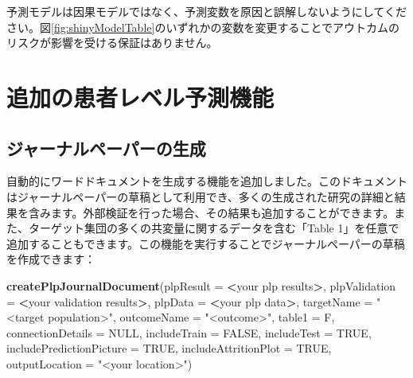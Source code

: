 \documentclass[
  11pt]{book}
\makeatletter
\newenvironment{Shaded}{\begin{snugshade}}{\end{snugshade}}
\newcommand{\AttributeTok}[1]{\textcolor[rgb]{0.13,0.29,0.53}{#1}}
\newcommand{\ConstantTok}[1]{\textcolor[rgb]{0.56,0.35,0.01}{#1}}
\newcommand{\FunctionTok}[1]{\textcolor[rgb]{0.13,0.29,0.53}{\textbf{#1}}}
\newcommand{\NormalTok}[1]{#1}
\newcommand{\SpecialCharTok}[1]{\textcolor[rgb]{0.81,0.36,0.00}{\textbf{#1}}}
\newcommand{\StringTok}[1]{\textcolor[rgb]{0.31,0.60,0.02}{#1}}
\newenvironment{kframe}{%
\medskip{}
\setlength{\fboxsep}{.8em}
 \def\at@end@of@kframe{}%
 \ifinner\ifhmode%
  \def\at@end@of@kframe{\end{minipage}}%
  \begin{minipage}{\columnwidth}%
 \fi\fi%
 \def\FrameCommand##1{\hskip\@totalleftmargin \hskip-\fboxsep
 \colorbox{myShadeColor}{##1}\hskip-\fboxsep
     \hskip-\linewidth \hskip-\@totalleftmargin \hskip\columnwidth}%
 \MakeFramed {\advance\hsize-\width
   \@totalleftmargin\z@ \linewidth\hsize
   \@setminipage}}%
 {\par\unskip\endMakeFramed%
 \at@end@of@kframe}
\newenvironment{rmdblock}[1]
  {
  \begin{itemize}
  \renewcommand{\labelitemi}{
    \raisebox{-.7\height}[0pt][0pt]{
      {\setkeys{Gin}{width=3em,keepaspectratio}\texttt{[image: images/\#1]}}
    }
  }
  \setlength{\fboxsep}{1em}
  \begin{kframe}
  \item
  }
  {
  \end{kframe}
  \end{itemize}
  }
\newenvironment{rmdimportant}
  {\begin{rmdblock}{important}}
  {\end{rmdblock}}
\theoremstyle{definition}
\theoremstyle{definition}
\theoremstyle{definition}
\theoremstyle{definition}
\theoremstyle{remark}
\makeatother
\begin{document}
\begin{rmdimportant}
予測モデルは因果モデルではなく、予測変数を原因と誤解しないようにしてください。図\ref{fig:shinyModelTable}のいずれかの変数を変更することでアウトカムのリスクが影響を受ける保証はありません。
\end{rmdimportant}

\section{追加の患者レベル予測機能}\label{ux8ffdux52a0ux306eux60a3ux8005ux30ecux30d9ux30ebux4e88ux6e2cux6a5fux80fd}

\subsection{ジャーナルペーパーの生成}\label{ux30b8ux30e3ux30fcux30caux30ebux30daux30fcux30d1ux30fcux306eux751fux6210}

自動的にワードドキュメントを生成する機能を追加しました。このドキュメントはジャーナルペーパーの草稿として利用でき、多くの生成された研究の詳細と結果を含みます。外部検証を行った場合、その結果も追加することができます。また、ターゲット集団の多くの共変量に関するデータを含む「Table 1」を任意で追加することもできます。この機能を実行することでジャーナルペーパーの草稿を作成できます：

\begin{Shaded}
\begin{Highlighting}[]
 \FunctionTok{createPlpJournalDocument}\NormalTok{(}\AttributeTok{plpResult =} \SpecialCharTok{\textless{}}\NormalTok{your plp results}\SpecialCharTok{\textgreater{}}\NormalTok{,}
             \AttributeTok{plpValidation =} \SpecialCharTok{\textless{}}\NormalTok{your validation results}\SpecialCharTok{\textgreater{}}\NormalTok{,}
             \AttributeTok{plpData =} \SpecialCharTok{\textless{}}\NormalTok{your plp data}\SpecialCharTok{\textgreater{}}\NormalTok{,}
             \AttributeTok{targetName =} \StringTok{"\textless{}target population\textgreater{}"}\NormalTok{,}
             \AttributeTok{outcomeName =} \StringTok{"\textless{}outcome\textgreater{}"}\NormalTok{,}
             \AttributeTok{table1 =}\NormalTok{ F,}
             \AttributeTok{connectionDetails =} \ConstantTok{NULL}\NormalTok{,}
             \AttributeTok{includeTrain =} \ConstantTok{FALSE}\NormalTok{,}
             \AttributeTok{includeTest =} \ConstantTok{TRUE}\NormalTok{,}
             \AttributeTok{includePredictionPicture =} \ConstantTok{TRUE}\NormalTok{,}
             \AttributeTok{includeAttritionPlot =} \ConstantTok{TRUE}\NormalTok{,}
             \AttributeTok{outputLocation =} \StringTok{"\textless{}your location\textgreater{}"}\NormalTok{)}
\end{Highlighting}
\end{Shaded}
\end{document}
